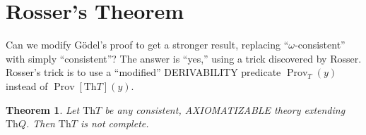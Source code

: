 \documentclass[10pt,a4paper]{article}
\newcommand*{\olup}[1]{\MakeUppercase{#1}}
\theoremstyle{plain}
\newtheorem{thm}{Theorem}[section]
\theoremstyle{definition}
\theoremstyle{remark}
\newcommand*{\olfileid}[3]{}
\newcommand*{\olsection}[1]{\section*{#1}}
\newcommand*{\ollabel}[1]{\label{#1}}
\providecommand{\Th}{\ensuremath{\mathrm{Th}}}
\providecommand{\OProv}{\operatorname{Prov}}
\providecommand{\ORProv}{\operatorname{Prov}}
\begin{document}



\olfileid{inc}{inp}{ros}

\olsection{Rosser's Theorem}

Can we modify G\"odel's proof to get a stronger result, replacing
``$\omega$-consistent'' with simply ``consistent''? The answer is
``yes,'' using a trick discovered by Rosser.  Rosser's trick is to use
a ``modified'' \olup{derivability} predicate $\ORProv_T(y)$ instead of
$\OProv[\Th{T}](y)$.

\begin{thm}
\ollabel{thm:rosser}
Let $\Th{T}$ be any consistent, \olup{axiomatizable} theory
extending $\Th{Q}$. Then $\Th{T}$ is not complete.
\end{thm}
\end{document}
